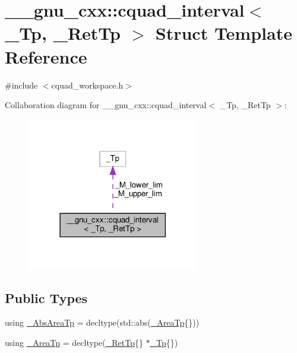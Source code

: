 \hypertarget{struct____gnu__cxx_1_1cquad__interval}{}\section{\+\_\+\+\_\+gnu\+\_\+cxx\+:\+:cquad\+\_\+interval$<$ \+\_\+\+Tp, \+\_\+\+Ret\+Tp $>$ Struct Template Reference}
\label{struct____gnu__cxx_1_1cquad__interval}


{\ttfamily \#include $<$cquad\+\_\+workspace.\+h$>$}



Collaboration diagram for \+\_\+\+\_\+gnu\+\_\+cxx\+:\+:cquad\+\_\+interval$<$ \+\_\+\+Tp, \+\_\+\+Ret\+Tp $>$\+:
\nopagebreak
\begin{figure}[H]
\begin{center}
\leavevmode
\includegraphics[width=213pt]{struct____gnu__cxx_1_1cquad__interval__coll__graph}
\end{center}
\end{figure}
\subsection*{Public Types}
\begin{DoxyCompactItemize}
\item 
using \hyperlink{struct____gnu__cxx_1_1cquad__interval_a3d2a1bbd0064e2a6c6edbcd514585311}{\+\_\+\+Abs\+Area\+Tp} = decltype(std\+::abs(\hyperlink{struct____gnu__cxx_1_1cquad__interval_aceac510aa3323d55b31555f96133cb40}{\+\_\+\+Area\+Tp}\{\}))
\item 
using \hyperlink{struct____gnu__cxx_1_1cquad__interval_aceac510aa3323d55b31555f96133cb40}{\+\_\+\+Area\+Tp} = decltype(\hyperlink{namespace____gnu__cxx_a886e03ece3d53ff7fa6c098a40f93fa5}{\+\_\+\+Ret\+Tp}\{\} $\ast$\hyperlink{namespace____gnu__cxx_a3b19a9c800ca194374ef9172290f7d79}{\+\_\+\+Tp}\{\})
\end{DoxyCompactItemize}
